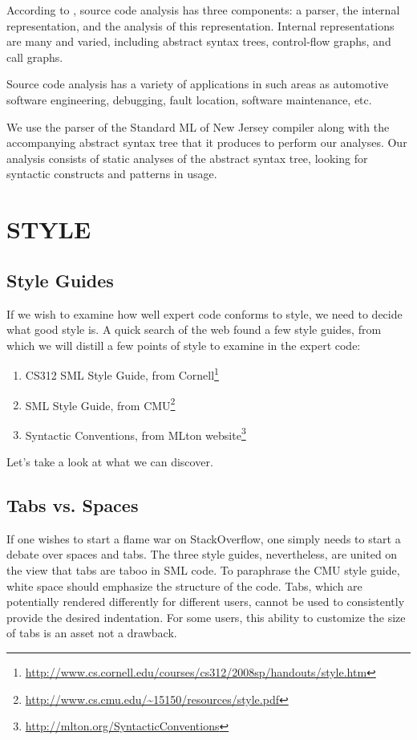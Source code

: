 \documentclass[12pt,abstracton]{scrartcl}
\begin{document}
According to \cite{Bin07}, source code analysis has three components: a parser,
the internal representation, and the analysis of this representation.
Internal representations are many and varied, including abstract syntax trees,
control-flow graphs, and call graphs.

Source code analysis has a variety of applications in such areas as
automotive software engineering, debugging, fault location, software maintenance,
etc.\cite{Bin07}

We use the parser of the Standard ML of New Jersey compiler along with the accompanying
abstract syntax tree that it produces to perform our analyses. Our analysis
consists of static analyses of the abstract syntax tree, looking for
syntactic constructs and patterns in usage.
\section{STYLE}\label{sec:style}
\subsection{Style Guides}\label{subsec:guide}
If we wish to examine how well expert code conforms to style, we need to decide
what good style is. A quick search of the web found a few style guides, from which
we will distill a few points of style to examine in the expert code:
\begin{enumerate}
\item CS312 SML Style Guide, from Cornell\footnote{\url{http://www.cs.cornell.edu/courses/cs312/2008sp/handouts/style.htm}}
\item SML Style Guide, from CMU\footnote{\url{http://www.cs.cmu.edu/~15150/resources/style.pdf}}
\item Syntactic Conventions, from MLton website\footnote{\url{http://mlton.org/SyntacticConventions}}
\end{enumerate}
Let's take a look at what we can discover.
\subsection{Tabs vs. Spaces}\label{subsec:tab}
If one wishes to start a flame war on StackOverflow, one simply needs to start
a debate over spaces and tabs. The three style guides, nevertheless, are
united on the view that tabs are taboo in SML code. To paraphrase the CMU
style guide, white space should emphasize the structure of the code.\cite{Cmu12}
Tabs, which are potentially rendered differently for
different users, cannot be used to consistently provide the desired indentation.
For some users, this ability to customize the size of tabs is an asset not
a drawback.
\end{document}

